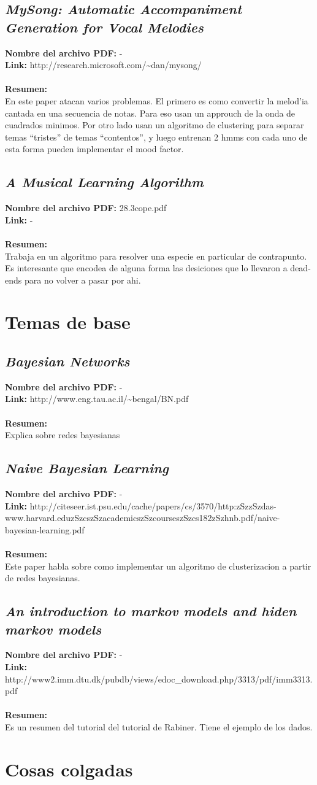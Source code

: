 \documentclass[a4paper,10pt]{article}
\newcommand{\titulo}[1]{\def\Titulo{#1}}
\newcommand{\resumen}[1]{\def\Resumen{#1}}
\newcommand{\archivo}[1]{\def\Archivo{#1}}
\newcommand{\link}[1]{\def\Link{#1}}
\newenvironment{resumenpaper}{
\let\Titulo\empty
\let\Resumen\empty
\let\Archivo-
\let\Link-
\let\Id\empty
}{
\subsection{\textit{\Titulo}}
\label{\Id}
\noindent \textbf{Nombre del archivo PDF: }{\Archivo}\\
\noindent \textbf{Link: }{\Link}\\ \\
\noindent \textbf{Resumen:} \\ {\Resumen}
}
\begin{document}
\begin{resumenpaper}
\titulo{MySong: Automatic Accompaniment Generation for Vocal Melodies}
\link{http://research.microsoft.com/\~{}dan/mysong/}
\resumen{En este paper atacan varios problemas. El primero es como convertir la melod'ia cantada en una
secuencia de notas. Para eso usan un approuch de la onda de cuadrados minimos. Por otro lado usan un
algoritmo de clustering para separar temas ``tristes'' de temas ``contentos'', y luego entrenan 2 hmms
con cada uno de esta forma pueden implementar el mood factor.}
\end{resumenpaper}

\begin{resumenpaper}
\titulo{A Musical Learning Algorithm}
\archivo{28.3cope.pdf}
\resumen{Trabaja en un algoritmo para resolver una especie en particular de contrapunto. Es interesante
que encodea de alguna forma las desiciones que lo llevaron a dead-ends para no volver a pasar por ahi.}
\end{resumenpaper}

\section{Temas de base}
\begin{resumenpaper}
 \titulo{Bayesian Networks}
 \link{http://www.eng.tau.ac.il/\~{}bengal/BN.pdf}
 \resumen{Explica sobre redes bayesianas}
\end{resumenpaper}

\begin{resumenpaper}
 \titulo{Naive Bayesian Learning}
 \link{http://citeseer.ist.psu.edu/cache/papers/cs/3570/http:zSzzSzdas-www.harvard.eduzSzcszSzacademicszSzcourseszSzcs182zSzhnb.pdf/naive-bayesian-learning.pdf}
 \resumen{Este paper habla sobre como implementar un algoritmo de clusterizacion a partir de redes bayesianas.}
\end{resumenpaper}

\begin{resumenpaper}
 \titulo{An introduction to markov models and hiden markov models}
 \link{http://www2.imm.dtu.dk/pubdb/views/edoc\_download.php/3313/pdf/imm3313.pdf}
 \resumen{Es un resumen del tutorial del tutorial de Rabiner. Tiene el ejemplo de los dados.}
\end{resumenpaper}


\section{Cosas colgadas}
\end{document}
